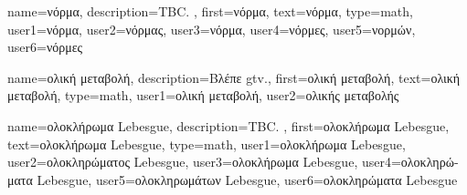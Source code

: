 
{name={\foreignlanguage{greek}{νόρμα}},
	description={TBC. },
	first={\foreignlanguage{greek}{νόρμα}},
	text={\foreignlanguage{greek}{νόρμα}},
	type=math,
	user1={\foreignlanguage{greek}{νόρμα}}, %
	user2={\foreignlanguage{greek}{νόρμας}}, %
	user3={\foreignlanguage{greek}{νόρμα}}, %
	user4={\foreignlanguage{greek}{νόρμες}}, %
	user5={\foreignlanguage{greek}{νορμών}}, %
	user6={\foreignlanguage{greek}{νόρμες}} %
}

{name={\foreignlanguage{greek}{ολική μεταβολή}}, 
	description={\foreignlanguage{greek}{Βλέπε} \gls{gtv}.},
	first={\foreignlanguage{greek}{ολική μεταβολή}},
	text={\foreignlanguage{greek}{ολική μεταβολή}},
	type=math,
	user1={\foreignlanguage{greek}{ολική μεταβολή}}, %
	user2={\foreignlanguage{greek}{ολικής μεταβολής}} %
}

{name={\foreignlanguage{greek}{ολοκλήρωμα} Lebesgue},
	description={TBC. },
	first={\foreignlanguage{greek}{ολοκλήρωμα} Lebesgue},
	text={\foreignlanguage{greek}{ολοκλήρωμα} Lebesgue},
	type=math,
	user1={\foreignlanguage{greek}{ολοκλήρωμα} Lebesgue}, %
  	user2={\foreignlanguage{greek}{ολοκληρώματος} Lebesgue}, %
	user3={\foreignlanguage{greek}{ολοκλήρωμα} Lebesgue}, %
	user4={\foreignlanguage{greek}{ολοκληρώματα} Lebesgue}, %
  	user5={\foreignlanguage{greek}{ολοκληρωμάτων} Lebesgue}, %
	user6={\foreignlanguage{greek}{ολοκληρώματα} Lebesgue} %
}

